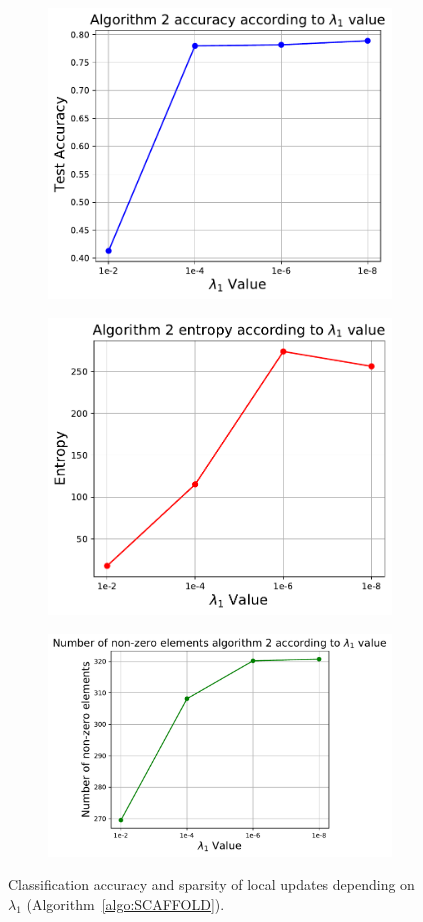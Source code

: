 \documentclass{article} %
\begin{document}
\begin{figure}[ht!]
\begin{subfigure}{.5\textwidth}
  \centering
  \includegraphics[width=.8\linewidth]{textfigure/algo2acc.pdf}
  \label{fig:sub41}
\end{subfigure}
\begin{subfigure}{.5\textwidth}
  \centering
  \includegraphics[width=.8\linewidth]{textfigure/algo2entropy.pdf}
  \label{fig:sub42}
\end{subfigure}
\begin{subfigure}{1\textwidth}
  \centering
  \includegraphics[width=.6\linewidth]{textfigure/algo2nonzero.pdf}
  \label{fig:sub43}
\end{subfigure}
\caption{Classification accuracy and sparsity of local updates depending on $\lambda_{1}$ (Algorithm~\ref{algo:SCAFFOLD}).}
\label{fig:algo2 lambda1}
\end{figure}
\end{document}
